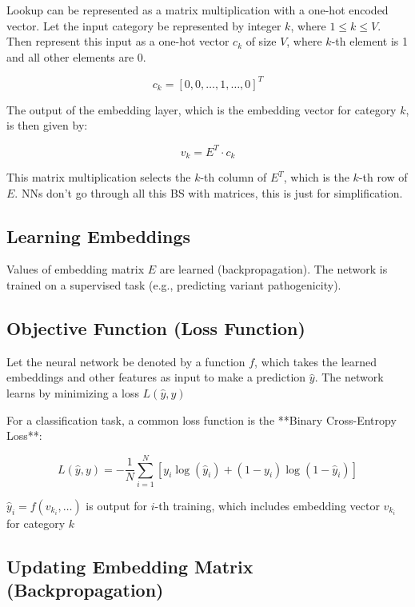 \documentclass[../main.tex]{subfiles}
\begin{document}
Lookup can be represented as a matrix multiplication with a one-hot encoded vector. Let the input category be represented by integer $k$, where $1 \le k \le V$. Then represent this input as a one-hot vector $c_k$ of size $V$, where $k$-th element is 1 and all other elements are 0.

\begin{equation}
    c_k = [0, 0, \dots, 1, \dots, 0]^T
\end{equation}

The output of the embedding layer, which is the embedding vector for category $k$, is then given by:

\begin{equation}
    v_k = E^T \cdot c_k
\end{equation}

This matrix multiplication selects the $k$-th column of $E^T$, which is the $k$-th row of $E$. NNs don't go through all this BS with matrices, this is just for simplification.

\subsection{Learning Embeddings}

Values of embedding matrix $E$ are learned (backpropagation). The network is trained on a supervised task (e.g., predicting variant pathogenicity).

\subsection{Objective Function (Loss Function)}

Let the neural network be denoted by a function $f$, which takes the learned embeddings and other features as input to make a prediction $\hat{y}$. The network learns by minimizing a loss $L(\hat{y}, y)$

For a classification task, a common loss function is the **Binary Cross-Entropy Loss**:

\begin{equation}
    L(\hat{y}, y) = - \frac{1}{N} \sum_{i=1}^{N} \left[ y_i \log(\hat{y}_i) + (1 - y_i) \log(1 - \hat{y}_i) \right]
\end{equation}

$\hat{y}_i = f(v_{k_i}, \dots)$ is output for $i$-th training, which includes embedding vector $v_{k_i}$ for category $k$

\subsection{Updating Embedding Matrix (Backpropagation)}
\end{document}
